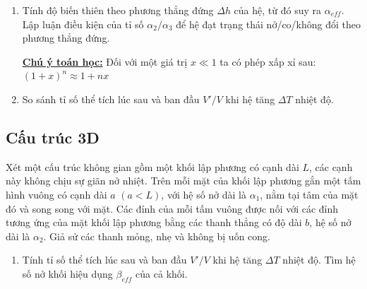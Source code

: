 

\newpage

\begin{enumerate}[label=(\alph*)]
\item Tính độ biến thiên theo phương thẳng đứng $\Delta h$ của hệ, từ đó suy ra $\alpha_{eff}$. Lập luận điều kiện của tỉ số $\alpha_2/\alpha_3$ để hệ đạt trạng thái nở/co/không đổi theo phương thẳng đứng. 

\textbf{\underline{Chú ý toán học:}} Đối với một giá trị $x \ll 1$ ta có phép xấp xỉ sau:
$(1 + x)^n \approx 1 + nx$
\vspace{8pt}

\item So sánh tỉ số thể tích lúc sau và ban đầu $V'/V$ khi hệ tăng $\Delta T$ nhiệt độ.
\end{enumerate}

\subsection*{Cấu trúc 3D}
Xét một cấu trúc không gian gồm một khối lập phương có cạnh dài $L$, các cạnh này không chịu sự giãn nở nhiệt. Trên mỗi mặt của khối lập phương gắn một tấm hình vuông có cạnh dài $a$ $(a<L)$, với hệ số nở dài là $\alpha_1$,  nằm tại tâm của mặt đó và song song với mặt. Các đỉnh của mỗi tấm vuông được nối với các đỉnh tương ứng của mặt khối lập phương bằng các thanh thẳng có độ dài $b$, hệ số nở dài là $\alpha_2$. Giả sử các thanh mỏng, nhẹ và không bị uốn cong.



\begin{enumerate}[label=(\alph*)]
\addtocounter{enumi}{2}
    \item Tính tỉ số thể tích lúc sau và ban đầu $V'/V$ khi hệ tăng $\Delta T$ nhiệt độ. Tìm hệ số nở khối hiệu dụng $\beta_{eff}$ của cả khối.   
\end{enumerate}